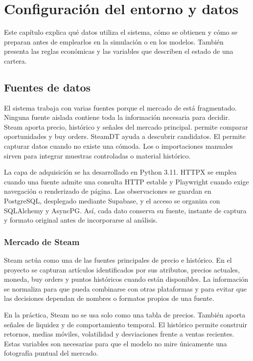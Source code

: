 \chapter{Configuración del entorno y datos}

\noindent Este capítulo explica qué datos utiliza el sistema, cómo se obtienen y cómo se preparan antes de emplearlos en la simulación o en los modelos. También presenta las reglas económicas y las variables que describen el estado de una cartera.

\section{Fuentes de datos}

El sistema trabaja con varias fuentes porque el mercado de  está fragmentado. Ninguna fuente aislada contiene toda la información necesaria para decidir. Steam aporta precio, histórico y señales del mercado principal.  permite comparar oportunidades y buy orders. SteamDT ayuda a descubrir candidatos. El  permite capturar datos cuando no existe una  cómoda. Los  o importaciones manuales sirven para integrar muestras controladas o material histórico.

La capa de adquisición se ha desarrollado en Python 3.11. HTTPX se emplea cuando una fuente admite una consulta HTTP estable y Playwright cuando exige navegación o renderizado de página. Las observaciones se guardan en PostgreSQL, desplegado mediante Supabase, y el acceso se organiza con SQLAlchemy y AsyncPG. Así, cada dato conserva su fuente, instante de captura y formato original antes de incorporarse al análisis.

\subsection{Mercado de Steam}

Steam actúa como una de las fuentes principales de precio e histórico. En el proyecto se capturan artículos identificados por sus atributos, precios actuales, moneda, buy orders y puntos históricos cuando están disponibles. La información se normaliza para que pueda combinarse con otras plataformas y para evitar que las decisiones dependan de nombres o formatos propios de una fuente.

En la práctica, Steam no se usa solo como una tabla de precios. También aporta señales de liquidez y de comportamiento temporal. El histórico permite construir retornos, medias móviles, volatilidad y desviaciones frente a ventas recientes. Estas variables son necesarias para que el modelo no mire únicamente una fotografía puntual del mercado.

